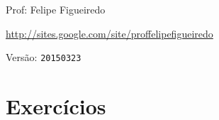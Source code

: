 \documentclass[a4paper]{article}
\begin{document}
\parbox[c]{.825\textwidth}{\raggedright%
{Prof: Felipe Figueiredo\par}
{\url{http://sites.google.com/site/proffelipefigueiredo}\par}
}

Versão: \verb|20150323|




\section{Exercícios}
\end{document}
